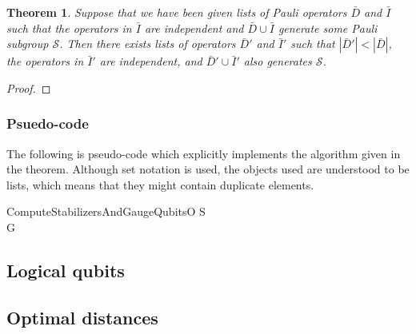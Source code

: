 \documentclass[twocolumn,showpacs,preprintnumbers,amsmath,amssymb,nofootinbib,pra,floatfix]{revtex4}
\newtheorem{theorem}{Theorem}
\begin{document}
\begin{theorem}
Suppose that we have been given lists of Pauli operators $\bar D$ and $\bar I$ such that the operators in $\bar I$ are independent and $\bar D \cup \bar I$ generate some Pauli subgroup $\mathcal{S}$.  Then there exists lists of operators $\bar D'$ and $\bar I'$ such that $|\bar D'|<|\bar D|$, the operators in $\bar I'$ are independent, and $\bar D' \cup \bar I'$ also generates $\mathcal{S}$.
\end{theorem}

\begin{proof}
\end{proof}

\subsubsection{Psuedo-code}

The following is pseudo-code which explicitly implements the algorithm given in the theorem.  Although set notation is used, the objects used are understood to be lists, which means that they might contain duplicate elements.

\begin{pseudocode}{ComputeStabilizersAndGaugeQubits}{O}
S \GETS {}\\
G \GETS {}
\end{pseudocode}
\subsection{Logical qubits}

\label{logical-qubits}
\subsection{Optimal distances}

\label{optimal-distances}
\end{document}
